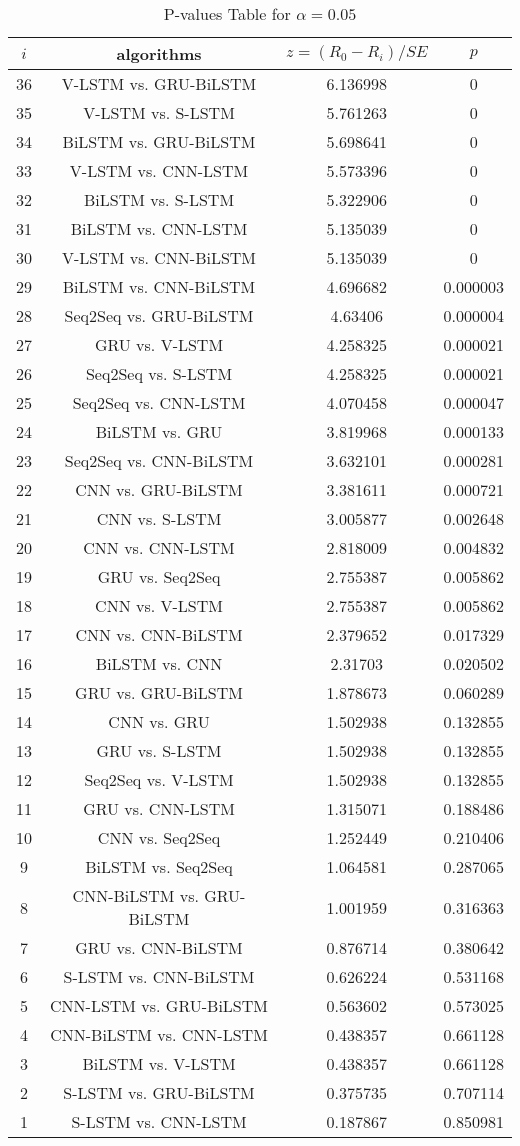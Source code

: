 \documentclass[a4paper,10pt]{article}
\begin{document}
\begin{landscape}
\begin{table}[!htp]
\centering\scriptsize
\begin{tabular}{cccc}
$i$&algorithms&$z=(R_0 - R_i)/SE$&$p$\\
\hline36&V-LSTM vs. GRU-BiLSTM&6.136998&0\\
35&V-LSTM vs. S-LSTM&5.761263&0\\
34&BiLSTM vs. GRU-BiLSTM&5.698641&0\\
33&V-LSTM vs. CNN-LSTM&5.573396&0\\
32&BiLSTM vs. S-LSTM&5.322906&0\\
31&BiLSTM vs. CNN-LSTM&5.135039&0\\
30&V-LSTM vs. CNN-BiLSTM&5.135039&0\\
29&BiLSTM vs. CNN-BiLSTM&4.696682&0.000003\\
28&Seq2Seq vs. GRU-BiLSTM&4.63406&0.000004\\
27&GRU vs. V-LSTM&4.258325&0.000021\\
26&Seq2Seq vs. S-LSTM&4.258325&0.000021\\
25&Seq2Seq vs. CNN-LSTM&4.070458&0.000047\\
24&BiLSTM vs. GRU&3.819968&0.000133\\
23&Seq2Seq vs. CNN-BiLSTM&3.632101&0.000281\\
22&CNN vs. GRU-BiLSTM&3.381611&0.000721\\
21&CNN vs. S-LSTM&3.005877&0.002648\\
20&CNN vs. CNN-LSTM&2.818009&0.004832\\
19&GRU vs. Seq2Seq&2.755387&0.005862\\
18&CNN vs. V-LSTM&2.755387&0.005862\\
17&CNN vs. CNN-BiLSTM&2.379652&0.017329\\
16&BiLSTM vs. CNN&2.31703&0.020502\\
15&GRU vs. GRU-BiLSTM&1.878673&0.060289\\
14&CNN vs. GRU&1.502938&0.132855\\
13&GRU vs. S-LSTM&1.502938&0.132855\\
12&Seq2Seq vs. V-LSTM&1.502938&0.132855\\
11&GRU vs. CNN-LSTM&1.315071&0.188486\\
10&CNN vs. Seq2Seq&1.252449&0.210406\\
9&BiLSTM vs. Seq2Seq&1.064581&0.287065\\
8&CNN-BiLSTM vs. GRU-BiLSTM&1.001959&0.316363\\
7&GRU vs. CNN-BiLSTM&0.876714&0.380642\\
6&S-LSTM vs. CNN-BiLSTM&0.626224&0.531168\\
5&CNN-LSTM vs. GRU-BiLSTM&0.563602&0.573025\\
4&CNN-BiLSTM vs. CNN-LSTM&0.438357&0.661128\\
3&BiLSTM vs. V-LSTM&0.438357&0.661128\\
2&S-LSTM vs. GRU-BiLSTM&0.375735&0.707114\\
1&S-LSTM vs. CNN-LSTM&0.187867&0.850981\\
\hline
\end{tabular}
\caption{P-values Table for $\alpha=0.05$}
\end{table}\pagebreak


\end{landscape}
\end{document}
